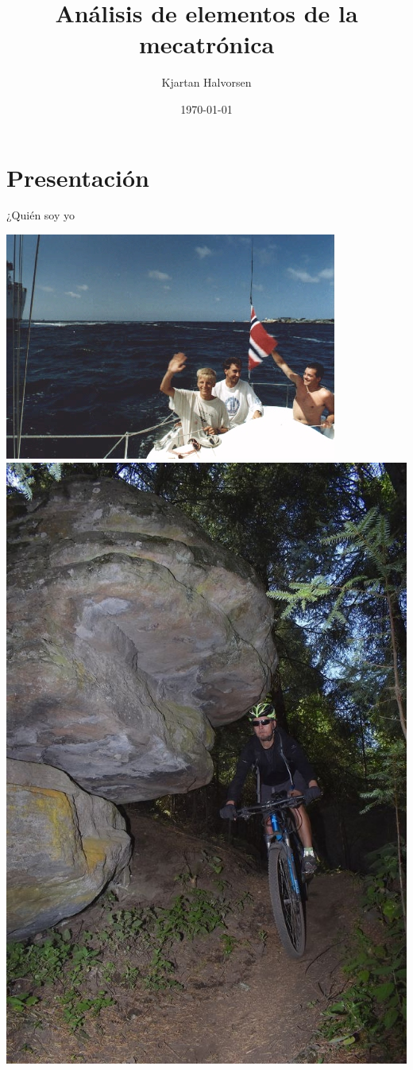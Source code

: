 \documentclass[presentation,aspectratio=169]{beamer}
\author{Kjartan Halvorsen}
\date{\today}
\title{Análisis de elementos de la mecatrónica}
\begin{document}
\maketitle

\section{Presentación}
\label{sec:orgdb73479}
\begin{frame}[label={sec:org3d5d631}]{¿Quién soy yo}
\begin{center}
\includegraphics[height=0.6\textheight]{../../figures/red-heat-2.jpeg}
\includegraphics[height=0.6\textheight]{../../figures/mtb.jpeg}
\end{center}
\end{frame}
\end{document}
